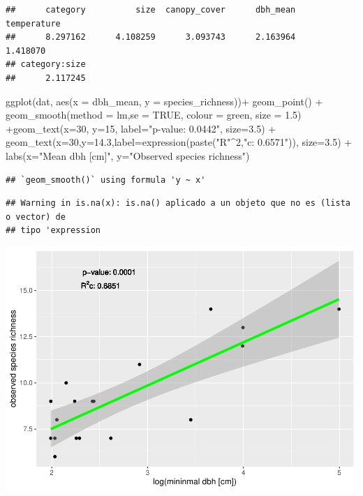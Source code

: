 \documentclass[
]{article}
\newenvironment{Shaded}{\begin{snugshade}}{\end{snugshade}}
\newcommand{\AttributeTok}[1]{\textcolor[rgb]{0.77,0.63,0.00}{#1}}
\newcommand{\ConstantTok}[1]{\textcolor[rgb]{0.00,0.00,0.00}{#1}}
\newcommand{\DecValTok}[1]{\textcolor[rgb]{0.00,0.00,0.81}{#1}}
\newcommand{\FloatTok}[1]{\textcolor[rgb]{0.00,0.00,0.81}{#1}}
\newcommand{\FunctionTok}[1]{\textcolor[rgb]{0.00,0.00,0.00}{#1}}
\newcommand{\NormalTok}[1]{#1}
\newcommand{\SpecialCharTok}[1]{\textcolor[rgb]{0.00,0.00,0.00}{#1}}
\newcommand{\StringTok}[1]{\textcolor[rgb]{0.31,0.60,0.02}{#1}}
\begin{document}
\begin{verbatim}
##      category          size  canopy_cover      dbh_mean   temperature 
##      8.297162      4.108259      3.093743      2.163964      1.418070 
## category:size 
##      2.117245
\end{verbatim}

\begin{Shaded}
\begin{Highlighting}[]
\FunctionTok{ggplot}\NormalTok{(dat, }\FunctionTok{aes}\NormalTok{(}\AttributeTok{x =}\NormalTok{ dbh\_mean, }\AttributeTok{y =}\NormalTok{ species\_richness))}\SpecialCharTok{+}
  \FunctionTok{geom\_point}\NormalTok{() }\SpecialCharTok{+}
  \FunctionTok{geom\_smooth}\NormalTok{(}\AttributeTok{method =}\NormalTok{ lm,}\AttributeTok{se =} \ConstantTok{TRUE}\NormalTok{, }\AttributeTok{colour =} \StringTok{\textquotesingle{}green\textquotesingle{}}\NormalTok{, }\AttributeTok{size =} \FloatTok{1.5}\NormalTok{) }\SpecialCharTok{+}\FunctionTok{geom\_text}\NormalTok{(}\AttributeTok{x=}\DecValTok{30}\NormalTok{, }\AttributeTok{y=}\DecValTok{15}\NormalTok{, }\AttributeTok{label=}\StringTok{"p{-}value: 0.0442"}\NormalTok{, }\AttributeTok{size=}\FloatTok{3.5}\NormalTok{) }\SpecialCharTok{+}
  \FunctionTok{geom\_text}\NormalTok{(}\AttributeTok{x=}\DecValTok{30}\NormalTok{,}\AttributeTok{y=}\FloatTok{14.3}\NormalTok{,}\AttributeTok{label=}\FunctionTok{expression}\NormalTok{(}\FunctionTok{paste}\NormalTok{(}\StringTok{"R"}\SpecialCharTok{\^{}}\DecValTok{2}\NormalTok{,}\StringTok{"c: 0.6571"}\NormalTok{)), }\AttributeTok{size=}\FloatTok{3.5}\NormalTok{) }\SpecialCharTok{+}
  \FunctionTok{labs}\NormalTok{(}\AttributeTok{x=}\StringTok{"Mean dbh [cm]"}\NormalTok{, }\AttributeTok{y=}\StringTok{"Observed species richness"}\NormalTok{)}
\end{Highlighting}
\end{Shaded}

\begin{verbatim}
## `geom_smooth()` using formula 'y ~ x'
\end{verbatim}

\begin{verbatim}
## Warning in is.na(x): is.na() aplicado a un objeto que no es (lista o vector) de
## tipo 'expression
\end{verbatim}

\includegraphics{birdsdataanalysis_files/figure-latex/unnamed-chunk-8-3.pdf}
\end{document}
